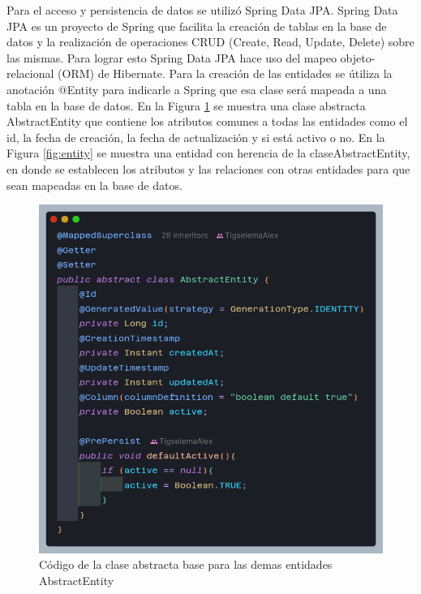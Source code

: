 Para el acceso y persistencia de datos se utilizó Spring Data JPA.
Spring Data JPA es un proyecto de Spring que facilita la creación de tablas en la base de datos y la realización de operaciones CRUD (Create, Read, Update, Delete) sobre las mismas.
Para lograr esto Spring Data JPA hace uso del mapeo objeto-relacional (ORM) de Hibernate.
\bigbreak
Para la creación de las entidades se útiliza la anotación @Entity para indicarle a Spring que esa clase será mapeada a una tabla en la base de datos.
En la Figura \ref{fig:abstract-entity} se muestra una clase abstracta AbstractEntity que contiene los atributos comunes a todas las entidades como el id, la fecha de creación, la fecha de actualización y si está activo o no.
En la Figura \ref{fig:entity} se muestra una entidad con herencia de la claseAbstractEntity, en donde se establecen los atributos y las relaciones con otras entidades para que sean mapeadas en la base de datos.

\begin{figure}[H]
    \centering
    \includegraphics[width=1\textwidth]{resources/images/abstractEntity}
    \caption{Código de la clase abstracta base para las demas entidades AbstractEntity}
    \label{fig:abstract-entity}
\end{figure}

